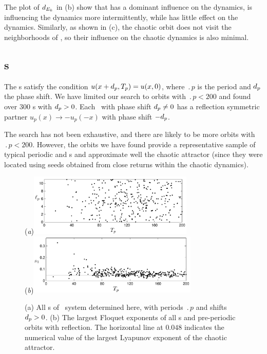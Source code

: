 {The plot of $d_{E_{k}}$ in (b) show that  has a dominant
influence on the dynamics,  is influencing the dynamics more intermittently, while
 has little effect on the dynamics.  Similarly, as shown in (c),
the chaotic orbit does not visit the neighborhoods of \reqva , so their influence on
the chaotic dynamics is also minimal.

}%



\subsection{\Rpo s}
\label{sec:rpos}

The \rpo s satisfy the condition 
$u(x+d_p,{T_{p}}) = u(x,0)$,
where $\period{p}$ is the period and $d_p$ the phase shift.
We have limited our search to orbits with $\period{p} < 200$ and found
over 300 \rpo s with $d_p > 0$.
Each \rpo\ with phase shift
$d_p \neq 0$ has a reflection symmetric partner
$u_p(x) \to -u_p(-x)$ with phase shift $-d_p$.

The search has not been exhaustive, and there are likely to be more
orbits with $\period{p} < 200$. However, the orbits we have found provide a representative sample of
typical periodic and \rpo s and approximate well the chaotic
attractor (since they were located using seeds obtained from close
returns within the chaotic dynamics).

\begin{figure}[h!t]
\begin{center}
 (\textit{a})\hspace{1ex}\includegraphics[width=0.7\textwidth]{../figs/ks22_rpos_Tdelta}\\
 (\textit{b})\includegraphics[width=0.72\textwidth]{../figs/ks22_rpos_lyap}
\end{center}
\caption[All \rpo s period, shifts and Floquet exponents]{
(a) All \rpo s of \KS\ system determined here, with periods $\period{p}$ and
shifts $d_p > 0$.
(b) The largest Floquet exponents  of all
\rpo s and pre-periodic orbits with reflection.
The horizontal line at $0.048$
indicates the numerical value  of the largest
Lyapunov exponent of the chaotic attractor.
} \label{f:ks22rposT}
\end{figure}

